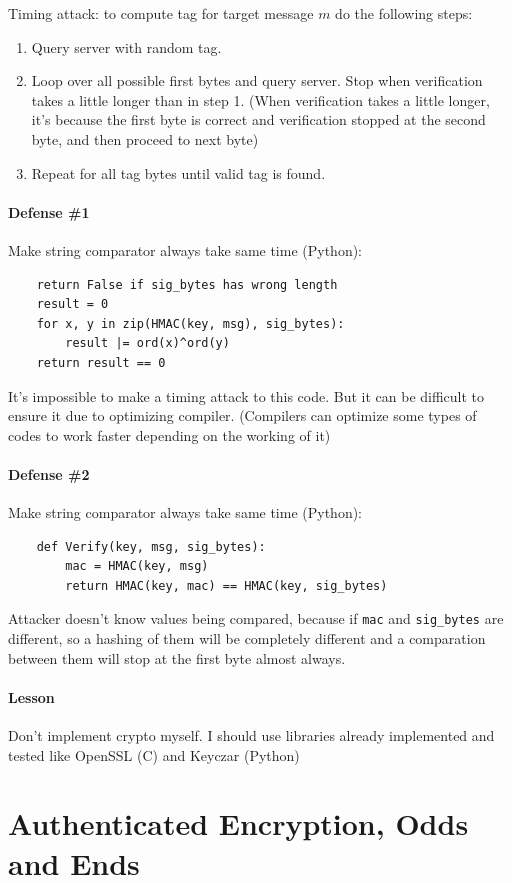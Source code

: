 \documentclass[12pt]{book}
\begin{document}
Timing attack: to compute tag for target message $m$ do the following steps:
\begin{enumerate}
	\item Query server with random tag.
	\item Loop over all possible first bytes and query server. Stop when verification takes a little longer than in step 1. (When verification takes a little longer, it's because the first byte is correct and verification stopped at the second byte, and then proceed to next byte)
	\item Repeat for all tag bytes until valid tag is found.
\end{enumerate}

\subsubsection{Defense \#1}
Make string comparator always take same time (Python):
\begin{verbatim}
    return False if sig_bytes has wrong length
    result = 0
    for x, y in zip(HMAC(key, msg), sig_bytes):
        result |= ord(x)^ord(y)
    return result == 0
\end{verbatim}It's impossible to make a timing attack to this code. But it can be difficult to ensure it due to optimizing compiler. (Compilers can optimize some types of codes to work faster depending on the working of it)

\subsubsection{Defense \#2}
Make string comparator always take same time (Python):
\begin{verbatim}
    def Verify(key, msg, sig_bytes):
        mac = HMAC(key, msg)
        return HMAC(key, mac) == HMAC(key, sig_bytes)
\end{verbatim}Attacker doesn't know values being compared, because if \verb|mac| and \verb|sig_bytes| are different, so a hashing of them will be completely different and a comparation between them will stop at the first byte almost always.

\subsubsection{Lesson}
Don't implement crypto myself. I should use libraries already implemented and tested like OpenSSL (C) and Keyczar (Python)

\chapter{Authenticated Encryption, Odds and Ends}
\end{document}
